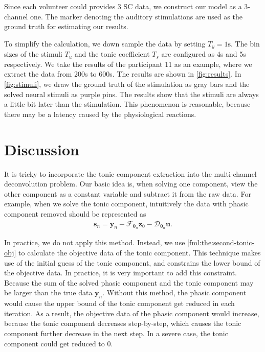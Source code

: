 \documentclass[10pt,conference]{ieeeconf}
\providecommand{\rm}[1]{\mathrm{#1}}
\begin{document}
Since each volunteer could provides 3 SC data, we construct our model as a 3-channel one. The marker denoting the auditory stimulations are used as the ground truth for estimating our results.

To simplify the calculation, we down sample the data by setting $T_y=1\rm{s}$. The bin sizes of the stimuli $T_u$ and the tonic coefficient $T_s$ are configured as 4s and 5s respectively. We take the results of the participant 11 as an example, where we extract the data from 200s to 600s. The results are shown in \cref{fig:results}. In \cref{fig:stimuli}, we draw the ground truth of the stimulation as gray bars and the solved neural stimuli as purple pins. The results show that the stimuli are always a little bit later than the stimulation. This phenomenon is reasonable, because there may be a latency caused by the physiological reactions.

\section{Discussion}

It is tricky to incorporate the tonic component extraction into the multi-channel deconvolution problem. Our basic idea is, when solving one component, view the other component as a constant variable and subtract it from the raw data. For example, when we solve the tonic component, intuitively the data with phasic component removed should be represented as
\begin{align}
  \mathbf{s}_n = \mathbf{y}_n - \mathcal{F}_{\boldsymbol{\theta}_n} \mathbf{z}_{0} - \mathcal{D}_{\boldsymbol{\theta}_n} \mathbf{u}.
\end{align}

In practice, we do not apply this method. Instead, we use \eqref{fml:the:second-tonic-obj} to calculate the objective data of the tonic component. This technique makes use of the initial guess of the tonic component, and constrains the lower bound of the objective data. In practice, it is very important to add this constraint. Because the sum of the solved phasic component and the tonic component may be larger than the true data $\mathbf{y}_n$. Without this method, the phasic component would cause the upper bound of the tonic component get reduced in each iteration. As a result, the objective data of the phasic component would increase, because the tonic component decreases step-by-step, which causes the tonic component further decrease in the next step. In a severe case, the tonic component could get reduced to 0.
\end{document}
